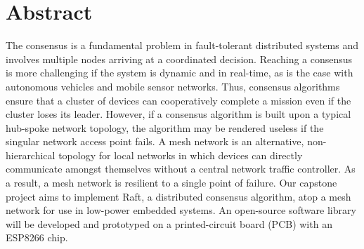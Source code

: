 \section{Abstract}
\newcommand{\nextInternalParagraphStartsHere}{}

The consensus is a fundamental problem in fault-tolerant distributed systems and involves multiple nodes arriving at a coordinated decision. Reaching a consensus is more challenging if the system is dynamic and in real-time, as is the case with autonomous vehicles and mobile sensor networks. Thus, consensus algorithms ensure that a cluster of devices can cooperatively complete a mission even if the cluster loses its leader. However, if a consensus algorithm is built upon a typical hub-spoke network topology, the algorithm may be rendered useless if the singular network access point fails. \nextInternalParagraphStartsHere A mesh network is an alternative, non-hierarchical topology for local networks in which devices can directly communicate amongst themselves without a central network traffic controller. As a result, a mesh network is resilient to a single point of failure. \nextInternalParagraphStartsHere Our capstone project aims to implement Raft, a distributed consensus algorithm, atop a mesh network for use in low-power embedded systems. An open-source software library will be developed and prototyped on a printed-circuit board (PCB) with an ESP8266 chip. 
